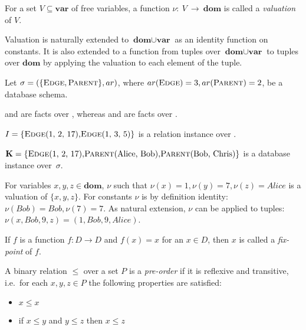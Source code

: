\begin{defn}[Valuation]
For a set $V \subseteq \textbf{var}$ of free variables, a function $\nu:~V~\to~\textbf{dom}$ is called a \emph{valuation} of $V$. 
\end{defn}

Valuation is naturally extended to $\textbf{dom} \cup \textbf{var}$ as an identity function on constants. It is also extended to a function from tuples over $\textbf{dom} \cup \textbf{var}$ to tuples over $\textbf{dom}$ by applying the valuation to each element of the tuple.

\begin{exmp}
Let $\sigma = (\{\textsc{Edge}, \textsc{Parent}\}, ar)$, where  $ar(\textsc{Edge}) = 3, ar(\textsc{Parent}) = 2$, be a database schema. 

 and  are facts over , whereas  and  are facts over . 

$I = \{\relat{Edge}{(1, 2, 17)}, \relat{Edge}{(1, 3, 5)}\}$ is a relation instance over .

$\textbf{K} = \{\relat{Edge}{(1, 2, 17)}, \relat{Parent}{(Alice, Bob)}, \relat{Parent}{(Bob, Chris)}\}$ is a database instance over~$\sigma$.

For variables $x, y, z \in \textbf{dom}$, $\nu$ such that $\nu(x) = 1, \nu(y) = 7, \nu(z) = Alice$ is a valuation of $\{x, y, z\}$. For constants $\nu$ is by definition identity: $\nu(Bob) = Bob, \nu(7) = 7$. As natural extension, $\nu$ can be applied to tuples: $\nu(x, Bob, 9, z) = (1, Bob, 9, Alice)$.

\end{exmp}

\begin{defn}
If $f$ is a function $f: D \to D$ and $f(x) = x$ for an $x \in D$, then $x$ is called a \emph{fix-point} of $f$.
\end{defn}

\begin{defn}
A binary relation $\le$ over a set $P$ is a \emph{pre-order} if it is reflexive and transitive, i.e.\ for each $x, y, z \in P$ the following properties are satisfied:
\begin{itemize}
\item $x \le x$
\item if $x \le y$ and $y \le z$ then $x \le z$
\end{itemize}
\end{defn}

